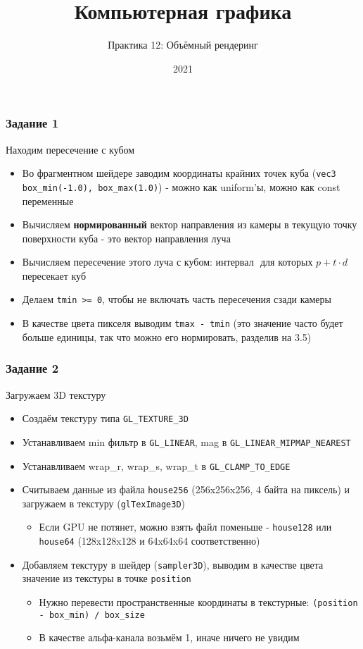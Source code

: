 \documentclass{beamer}
\title{Компьютерная графика}
\subtitle{Практика 12: Объёмный рендеринг}
\date{2021}
\begin{document}
\frame{\titlepage}

\begin{frame}[fragile]
\frametitle{Задание 1}
Находим пересечение с кубом
\begin{itemize}
\item Во фрагментном шейдере заводим координаты крайних точек куба (\verb|vec3 box_min(-1.0), box_max(1.0)|) - можно как uniform'ы, можно как const переменные
\pause
\item Вычисляем \textbf{нормированный} вектор направления из камеры в текущую точку поверхности куба - это вектор направления луча
\pause
\item Вычисляем пересечение этого луча с кубом: интервал \begin{math}[t_{min}, t_{max}]\end{math} для которых \begin{math}p + t \cdot d\end{math} пересекает куб
\pause
\item Делаем \verb|tmin >= 0|, чтобы не включать часть пересечения сзади камеры
\pause
\item В качестве цвета пикселя выводим \verb|tmax - tmin| (это значение часто будет больше единицы, так что можно его нормировать, разделив на 3.5)
\end{itemize}
\end{frame}

\begin{frame}[fragile]
\frametitle{Задание 2}
Загружаем 3D текстуру
\begin{itemize}
\item Создаём текстуру типа \verb|GL_TEXTURE_3D|
\pause
\item Устанавливаем min фильтр в \verb|GL_LINEAR|, mag в \verb|GL_LINEAR_MIPMAP_NEAREST|
\pause
\item Устанавливаем wrap\_r, wrap\_s, wrap\_t в \verb|GL_CLAMP_TO_EDGE|
\pause
\item Считываем данные из файла \verb|house256| (256x256x256, 4 байта на пиксель) и загружаем в текстуру (\verb|glTexImage3D|)
\begin{itemize}
\item Если GPU не потянет, можно взять файл поменьше - \verb|house128| или \verb|house64| (128x128x128 и 64x64x64 соответственно)
\end{itemize}
\pause
\item Добавляем текстуру в шейдер (\verb|sampler3D|), выводим в качестве цвета значение из текстуры в точке \verb|position|
\begin{itemize}
\item Нужно перевести пространственные координаты в текстурные: \verb|(position - box_min) / box_size|
\item В качестве альфа-канала возьмём 1, иначе ничего не увидим
\end{itemize}
\end{itemize}
\end{frame}
\end{document}
